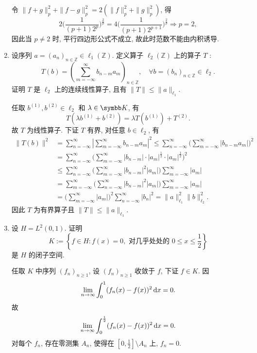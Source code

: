 \begin{enumerate}
\begin{answer}
      令 $\|f+g\|_p^2+\|f-g\|_p^2=2(\|f\|_p^2+\|g\|_p^2)$, 得
      \[2\biggl(\frac{1}{(p+1)2^p}\biggr)^{\frac{2}{p}}=4\biggl(\frac{1}{(p+1)2^{p+1}}\biggr)^{\frac{2}{p}}\Rightarrow p=2,\]
      因此当 $p\neq 2$ 时, 平行四边形公式不成立, 故此时范数不能由内积诱导.
    \end{answer}
  \item 设序列 $a=\left(a_{n}\right)_{n \in \mathbb{Z}} \in \ell_{1}(\mathbb{Z})$. 定义算子 $\ell_{2}(\mathbb{Z})$ 上的算子 $T$ :
  \[
    T(b)=\left(\sum_{m=-\infty}^{\infty} b_{n-m} a_{m}\right)_{n \in \mathbb{Z}}, \quad \forall b=\left(b_{n}\right)_{n \in \mathbb{Z}} \in \ell_{2} .
  \]证明 $T$ 是 $\ell_{2}$ 上的连续线性算子, 且有 $\|T\| \leq\|a\|_{\ell_{1}}$.
    \begin{answer}
      任取 $b^{(1)},b^{(2)}\in\ell_2$ 和 $\lambda\in\K$, 有
      \[T(\lambda b^{(1)}+b^{(2)})=\lambda T(b^{(1)})+T^{(2)}.\]
      故 $T$ 为线性算子. 下证 $T$ 有界, 对任意 $b\in\ell_2$, 有
      \begin{align*}
          \|T(b)\|^2
          & =\sum_{n=-\infty}^{\infty}\left|\sum_{m=-\infty}^{\infty}b_{n-m}a_m\right|^2 \leq\sum_{n=-\infty}^{\infty}\biggl(\sum_{m=-\infty}^{\infty}|b_{n-m}a_m|\biggr)^2 \\
          & =\sum_{n=-\infty}^{\infty}\biggl(\sum_{m=-\infty}^{\infty}|b_{n-m}|\cdot|a_m|^{\frac{1}{2}}\cdot|a_m|^{\frac{1}{2}}\biggr)^2 \\
          & \leq\sum_{n=-\infty}^{\infty}\biggl(\sum_{m=-\infty}^{\infty}|b_{n-m}|^2|a_m|\biggr)\sum_{m=-\infty}^{\infty}|a_m| \\
          & =\sum_{m=-\infty}^{\infty}\biggl(\sum_{n=-\infty}^{\infty}|b_{n-m}|^2|a_m|\biggr)\sum_{m=-\infty}^{\infty}|a_m| \\
          & =\biggl(\sum_{m=-\infty}^{\infty}|a_m|\biggr)^2\sum_{n=-\infty}^{\infty}|b_n|^2=\|a\|_{\ell_1}^2\|b\|_{\ell_2}^2.
      \end{align*}
      因此 $T$ 为有界算子且 $\|T\|\leq\|a\|_{\ell_1}$.
    \end{answer}
  \item  设 $H=L^{2}(0,1)$. 证明
  \[
    K:=\left\{f \in H: f(x)=0, \text { 对几乎处处的 } 0 \leq x \leq \frac{1}{2}\right\}
  \]
  是 $H$ 的闭子空间.
    \begin{answer}
      任取 $K$ 中序列 $(f_n)_{n\geq 1}$, 设 $(f_n)_{n\geq 1}$ 收敛于 $f$, 下证 $f\in K$. 因
      \[\lim_{n\to\infty}\int_0^1 (f_n(x)-f(x))^2\mathop{}\!\mathrm{d} x=0.\]
      故
      \[\lim_{n\to\infty}\int_0^{\frac{1}{2}} (f_n(x)-f(x))^2\mathop{}\!\mathrm{d} x=0.\]
      对每个 $f_n$, 存在零测集 $A_n$, 使得在 $[0,\frac{1}{2}]\setminus A_n$ 上, $f_n=0$.

\end{answer}
\end{enumerate}
